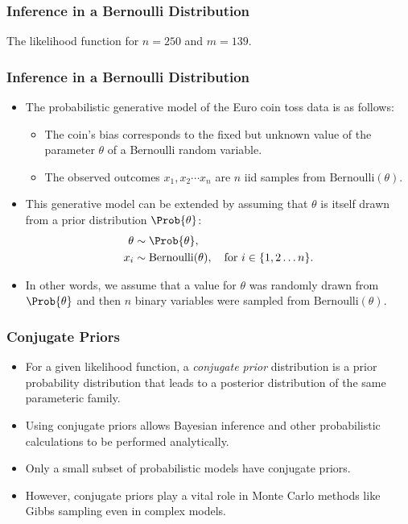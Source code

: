 \documentclass{slides}
\begin{document}
\begin{frame}
	\frametitle{Inference in a Bernoulli Distribution}
	
		The likelihood function for $n=250$ and $m=139$.
\end{frame}
\begin{frame}
	\frametitle{Inference in a Bernoulli Distribution}
	\begin{itemize}
		\item The probabilistic generative model of the Euro coin toss data is as follows:
			\begin{itemize}
				\item The coin's bias corresponds to the fixed but unknown value of the parameter $\theta$ of a Bernoulli random variable.
				\item The observed outcomes $x_1, x_2 \cdots x_n$ are $n$ iid samples from $\textrm{Bernoulli}(\theta)$.
			\end{itemize}
		\item This generative model can be extended by assuming that $\theta$ is itself drawn from a prior distribution $\Prob{\theta}$:
			\begin{align*}
				\theta &\sim \Prob{\theta},\\
				x_i &\sim \textrm{Bernoulli}(\theta),\quad\text{for $i \in \{1,2\ldots n\}$.}
			\end{align*}
		\item In other words, we assume that a value for $\theta$ was randomly drawn from $\Prob{\theta}$ and then $n$ binary variables were sampled from $\textrm{Bernoulli}(\theta)$.
	\end{itemize}
\end{frame}

\begin{frame}
	\frametitle{Conjugate Priors}
	\begin{itemize}
		\item For a given likelihood function, a \emph{conjugate prior} distribution is a prior probability distribution that leads to a posterior distribution of the same parameteric family.
		\item Using conjugate priors allows Bayesian inference and other probabilistic calculations to be performed analytically.
		\item Only a small subset of probabilistic models have conjugate priors.
		\item However, conjugate priors play a vital role in Monte Carlo methods like Gibbs sampling even in complex models.
	\end{itemize}
\end{frame}
\end{document}
